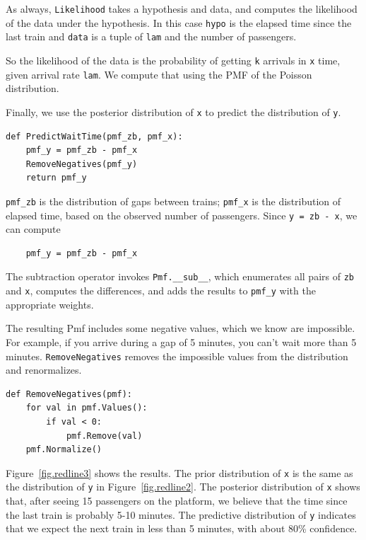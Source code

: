 \documentclass[12pt]{book}
\begin{document}
As always, {\tt Likelihood} takes a hypothesis and data, and
computes the likelihood of the data under the hypothesis.
In this case {\tt hypo} is the elapsed time since the last train
and {\tt data} is a tuple of {\tt lam} and the number of
passengers.

So the likelihood of the data is the probability of getting
{\tt k} arrivals in {\tt x} time, given arrival rate
{\tt lam}.  We compute that using the PMF of the Poisson
distribution.

Finally, we use the posterior distribution of {\tt x}
to predict the distribution of {\tt y}.

\begin{verbatim}
def PredictWaitTime(pmf_zb, pmf_x):
    pmf_y = pmf_zb - pmf_x
    RemoveNegatives(pmf_y)
    return pmf_y
\end{verbatim}

\verb"pmf_zb" is the distribution of gaps between trains;
\verb"pmf_x" is the distribution of elapsed time, based on
the observed number of passengers.  Since {\tt y = zb - x},
we can compute

\begin{verbatim}
    pmf_y = pmf_zb - pmf_x
\end{verbatim}

The subtraction operator invokes \verb"Pmf.__sub__", which enumerates
all pairs of {\tt zb} and {\tt x}, computes the differences, and adds
the results to \verb"pmf_y" with the appropriate weights.

The resulting Pmf includes some negative values, which we know are
impossible.  For example, if you arrive during a gap of 5 minutes, you
can't wait more than 5 minutes.  {\tt RemoveNegatives} removes the
impossible values from the distribution and renormalizes.

\begin{verbatim}
def RemoveNegatives(pmf):
    for val in pmf.Values():
        if val < 0:
            pmf.Remove(val)
    pmf.Normalize()
\end{verbatim}

Figure~\ref{fig.redline3} shows the results.  The prior distribution
of {\tt x} is the same as the distribution of {\tt y} in
Figure~\ref{fig.redline2}.  The posterior distribution of {\tt x}
shows that, after seeing 15 passengers on the platform, we believe
that the time since the last train is probably 5-10 minutes.  The
predictive distribution of {\tt y} indicates that we expect the next
train in less than 5 minutes, with about 80\% confidence.
\end{document}
